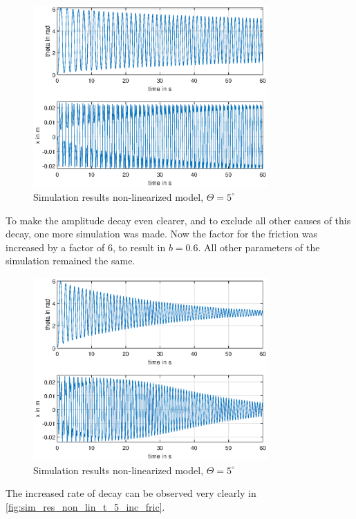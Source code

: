 \begin{figure}[H]
    \centering
    \includegraphics[width=0.8\textwidth]{Lab_report/pics/plots/non_linearized_results_theta_5.eps}
    \caption{Simulation results non-linearized model, $\Theta=5^\circ$}
    \label{fig:sim_res_non_lin_t_5}
\end{figure}
To make the amplitude decay even clearer, and to exclude all other causes of this decay, one more simulation was made. Now the factor for the friction was increased by a factor of 6, to result in $b=0.6$. All other parameters of the simulation remained the same. 
\begin{figure}[H]
    \centering
    \includegraphics[width=0.8\textwidth]{Lab_report/pics/plots/non_linearized_results_inc_friction.eps}
    \caption{Simulation results non-linearized model, $\Theta=5^\circ$}
    \label{fig:sim_res_non_lin_t_5_inc_fric}
\end{figure}
The increased rate of decay can be observed very clearly in \autoref{fig:sim_res_non_lin_t_5_inc_fric}.

